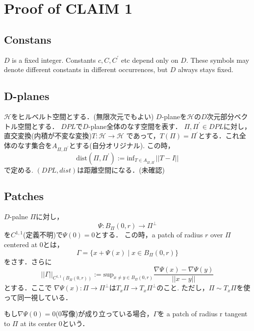 \documentclass{ujarticle}
\newcommand{\bpd}{B_{\Pi}(0,r)}
\newcommand{\gnd}{||\Gamma||_{C^{1,1}(\bpd)}}
\begin{document}
\section{Proof of CLAIM 1}
\label{sec:Proof of CLAIM 1}

\subsection{Constans}
\label{sub:Constans}
$D$ is a fixed integer. Constants $c,C,C^{\prime}$ etc depend only on $D$. These symbols may denote
different constants in different occurrences, but $D$ always stays fixed.

\subsection{D-planes}
\label{sub:D-planes}
$\mathcal{H}$をヒルベルト空間とする．(無限次元でもよい)
$D$-planeを$\mathcal{H}$の$D$次元部分ベクトル空間とする．
$DPL$で$D$-plane全体のなす空間を表す．
$\Pi,\Pi^\prime \in DPL$に対し，直交変換(内積が不変な変換)$T: \mathcal{H} \to \mathcal{H}$
であって，$T(\Pi)= \Pi^\prime$とする．これ全体のなす集合を$A_{\Pi,\Pi^\prime}$とする(自分オリジナル).
この時，
\begin{equation*}
 \mathrm{dist} (\Pi,\Pi^\prime):= \mathrm{inf}_{T \in A_{\Pi,\Pi^\prime}} ||T -I||
\end{equation*}
で定める.
$(DPL,dist)$は距離空間になる．(未確認)

\subsection{Patches}
\label{sub:Patches}
$D$-palne $\Pi$に対し，
\begin{equation*}
 \Psi :\bpd \to \Pi^{\perp}
\end{equation*}
を$C^{1,1}$(定義不明)で$\Psi(0)=0$とする．
この時，a patch of radius $r$ over $\Pi$ centered at 0とは，
\begin{equation*}
 \Gamma=\{ x + \Psi(x) \mid x \in \bpd \}
\end{equation*}
をさす．さらに
\begin{equation*}
 \gnd := \mathrm{sup}_{x \neq y \in \bpd} \frac{ \nabla \Psi(x) - \nabla \Psi(y)}{||x - y||}
\end{equation*}
とする．ここで
$\nabla\Psi(x):\Pi \to \Pi^{\perp}$は$T_x\Pi \to T_x\Pi^{\perp}$のこと.
ただし，$\Pi \sim T_x \Pi$を使って同一視している．

もし$ \nabla \Psi(0)=0$(0写像)が成り立っている場合，$\Gamma$を
a patch of radius r tangent to $\Pi$ at its center 0という．
\end{document}
